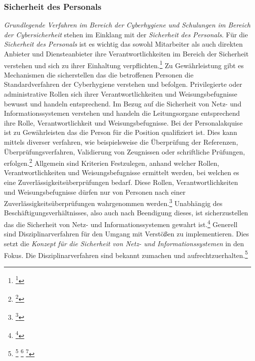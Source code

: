 \documentclass[11pt,a4paper,hidelinks]{article}   %
\begin{document}
            \subsubsection{Sicherheit des Personals}
            \emph{Grundlegende Verfahren im Bereich der Cyberhygiene und Schulungen im Bereich der Cybersicherheit} stehen im Einklang mit der \emph{Sicherheit des Personals}. Für die \emph{Sicherheit des Personals} ist es wichtig das sowohl Mitarbeiter als auch direkten Anbieter und Diensteanbieter ihre Verantwortlichkeiten im Bereich der Sicherheit verstehen und sich zu ihrer Einhaltung verpflichten.\footnote{\footcite[Vgl.][, Anhang, Nummer 10.1.1.]{EU2024-2690}} Zu Gewährleistung gibt es Mechanismen die sicherstellen das die betroffenen Personen die Standardverfahren der Cyberhygiene verstehen und befolgen. Privilegierte oder administrative Rollen sich ihrer Verantwortlichkeiten und Weisungsbefugnisse bewusst und handeln entsprechend. Im Bezug auf die Sicherheit von Netz- und Informationssystemen verstehen und handeln die Leitungsorgane entsprechend ihre Rolle, Verantwortlichkeit und Weisungsbefugnisse. Bei der Personalakquise ist zu Gewährleisten das die Person für die Position qualifiziert ist. Dies kann mittels diverser verfahren, wie beispielsweise die Überprüfung der Referenzen, Überprüfungsverfahren, Validierung von Zeugnissen oder schriftliche Prüfungen, erfolgen.\footnote{\footcite[Vgl.][, Anhang, Nummer 10.1.2.]{EU2024-2690}} Allgemein sind Kriterien Festzulegen, anhand welcher Rollen, Verantwortlichkeiten und Weisungsbefugnisse ermittelt werden, bei welchen es eine Zuverlässigkeitsüberprüfungen bedarf. Diese Rollen, Verantwortlichkeiten und Weisungsbefugnisse dürfen nur von Personen nach einer Zuverlässigkeitsüberprüfungen wahrgenommen werden.\footnote{\footcite[Vgl.][, Anhang, Nummer 10.2.1. \& 10.2.2.]{EU2024-2690}} Unabhängig des Beschäftigungsverhältnisses, also auch nach Beendigung dieses, ist sicherzustellen das die Sicherheit von Netz- und Informationssystemen gewahrt ist.\footnote{\footcite[Vgl.][, Anhang, Nummer 10.3.1. \& 10.3.2.]{EU2024-2690}} Generell sind Disziplinarverfahren für den Umgang mit Verstößen zu implementieren. Dies setzt die \emph{Konzept für die Sicherheit von Netz- und Informationssystemen} in den Fokus. Die Disziplinarverfahren sind bekannt zumachen und aufrechtzuerhalten.\footnote{
                \footcite[Vgl.][, Anhang, Nummer 10.4.1. \& 10.4.2.]{EU2024-2690}
                \footcite[Vgl.][, Anhang, Nummer 8]{EU2024-2690}
                \footcite[Vgl.][, §30 Absatz 2, Nummer 7 und 9]{NIS2UmsuCG} %
            }\medbreak
\end{document}
